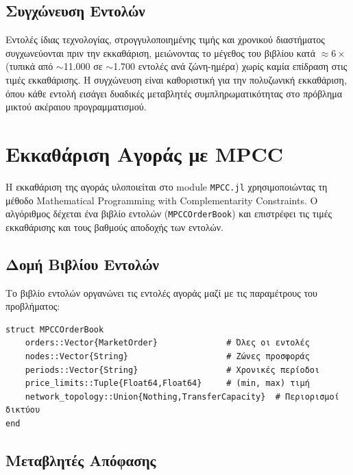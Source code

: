 \subsection{Συγχώνευση Εντολών}
\label{subsec:order-merging}

Εντολές ίδιας τεχνολογίας, στρογγυλοποιημένης τιμής και χρονικού διαστήματος συγχωνεύονται πριν την εκκαθάριση, μειώνοντας το μέγεθος του βιβλίου κατά $\approx 6\times$ (τυπικά από $\sim$11.000 σε $\sim$1.700 εντολές ανά ζώνη-ημέρα) χωρίς καμία επίδραση στις τιμές εκκαθάρισης. Η συγχώνευση είναι καθοριστική για την πολυζωνική εκκαθάριση, όπου κάθε εντολή εισάγει δυαδικές μεταβλητές συμπληρωματικότητας στο πρόβλημα μικτού ακέραιου προγραμματισμού.


\section{Εκκαθάριση Αγοράς με MPCC}
\label{sec:mpcc-market-clearing}

Η εκκαθάριση της αγοράς υλοποιείται στο module \texttt{MPCC.jl} χρησιμοποιώντας τη μέθοδο Mathematical Programming with Complementarity Constraints. Ο αλγόριθμος δέχεται ένα βιβλίο εντολών (\texttt{MPCCOrderBook}) και επιστρέφει τις τιμές εκκαθάρισης και τους βαθμούς αποδοχής των εντολών.

\subsection{Δομή Βιβλίου Εντολών}
\label{subsec:order-book-structure}

Το βιβλίο εντολών οργανώνει τις εντολές αγοράς μαζί με τις παραμέτρους του προβλήματος:

\begin{samepage}
\begin{verbatim}
struct MPCCOrderBook
    orders::Vector{MarketOrder}              # Όλες οι εντολές
    nodes::Vector{String}                    # Ζώνες προσφοράς
    periods::Vector{String}                  # Χρονικές περίοδοι
    price_limits::Tuple{Float64,Float64}     # (min, max) τιμή
    network_topology::Union{Nothing,TransferCapacity}  # Περιορισμοί δικτύου
end
\end{verbatim}
\end{samepage}

\subsection{Μεταβλητές Απόφασης}
\label{subsec:mpcc-variables}

